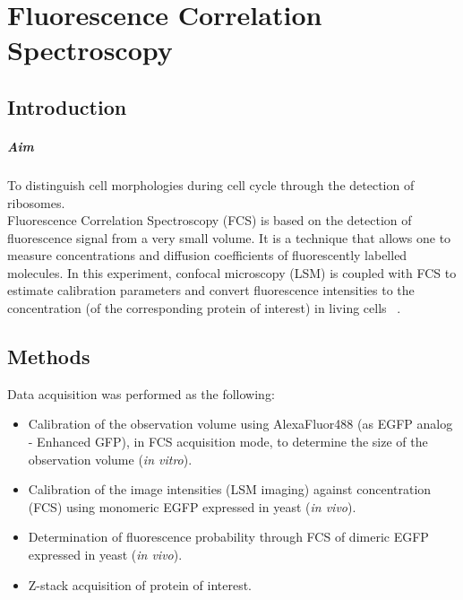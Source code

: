 
\chapter{Fluorescence Correlation Spectroscopy}
\label{chp:FCS}


\section{Introduction}
\paragraph{Aim} To distinguish cell morphologies during cell cycle through the detection of ribosomes. 
\\

Fluorescence Correlation Spectroscopy (FCS) is based on the detection of fluorescence signal from a very small volume.
It is a technique that allows one to measure concentrations and diffusion coefficients of fluorescently labelled molecules.
In this experiment, confocal microscopy (LSM) is coupled with FCS to estimate calibration parameters and convert fluorescence intensities to the concentration (of the corresponding protein of interest) in living cells ~\cite{Politi2018}.

\section{Methods}
Data acquisition was performed as the following:
\begin{itemize}
\item Calibration of the observation volume using AlexaFluor488 (as EGFP analog - Enhanced GFP), in FCS acquisition mode, to determine the size of the observation volume (\textit{in vitro}). 
\item Calibration of the image intensities (LSM imaging) against concentration (FCS) using monomeric EGFP expressed in yeast (\textit{in vivo}).
\item Determination of fluorescence probability through FCS of dimeric EGFP expressed in yeast (\textit{in vivo}).
\item Z-stack acquisition of protein of interest.
\end{itemize}

